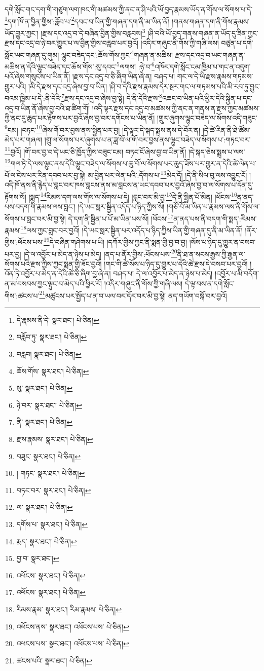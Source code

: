 དགེ་སློང་གང་དག་གི་གཙུག་ལག་ཁང་གི་མཚམས་ཀྱི་ནང་ན་ཤི་པའི་ཡོ་བྱད་རྣམས་ཡོད་ན་གོས་ལ་སོགས་པ་དེ་\footnote{དེ་རྣམས་ནི་དེ་  སྣར་ཐང་།  པེ་ཅིན། }དག་ཁོ་ན་བྱིན་གྱིས་:རློབ་པ་\footnote{བརློབ་ཏུ་  སྣར་ཐང་།  པེ་ཅིན། }དབང་བ་ཡིན་གྱི་གཞན་དག་ནི་མ་ཡིན་ནོ། །གནས་གཞན་དག་ནི་གོས་རྣམས་ཡོད་གྱུར་ཀྱང་། །རྫས་དང་འདྲ་བ་དེ་བཞིན་བྱིན་གྱིས་བརླབས།\footnote{བརླབ།  སྣར་ཐང་།  པེ་ཅིན། } །ཤི་བའི་ཡོ་བྱད་གནས་གཞན་ན་ཡོད་དུ་ཟིན་ཀྱང་རྫས་དང་འདྲ་བ་ཉེ་བར་གྱུར་པ་ལ་བྱིན་གྱིས་བརླབ་པར་བྱའོ། །འདིར་གཞུང་ནི་གོས་ཀྱི་གཞི་ལས། བཙུན་པ་དགེ་སློང་ཡང་གཞན་དུ་གུམ། ལྷུང་བཟེད་དང་:ཆོས་གོས་ཀྱང་\footnote{ཆོས་གོས་  སྣར་ཐང་།  པེ་ཅིན། }གཞན་ན་མཆིས། རྫས་དང་འདྲ་བ་ཡང་གཞན་ན་མཆིས་ན་དེའི་ལྷུང་བཟེད་དང་ཆོས་གོས་:སུ་དབང་\footnote{སུ་  སྣར་ཐང་།  པེ་ཅིན། }ལགས། :ཉེ་བ་\footnote{ཉེ་བར་  སྣར་ཐང་།  པེ་ཅིན། }འཁོར་དགེ་སློང་ངམ་ཁྱིམ་པ་གང་ན་འདུག་པའོ་ཞེས་གསུངས་པ་ཡིན་ནོ། །རྫས་དང་འདྲ་བ་ཅི་ཞིག་ཡིན་ཞེ་ན། བཤད་པ། གང་ལ་དེ་ཡི་རྫས་རྣམས་གཏམས་གྱུར་པའི། །མི་དེ་རྫས་དང་འདྲ་ཞེས་བྱ་བ་ཡིན། །ཤི་བ་དེའི་རྫས་རྣམས་དེར་སྔར་གང་ལ་གཏམས་པའི་མི་རབ་ཏུ་བྱུང་བའམ་ཁྱིམ་པ་དེ་:ནི་དེའི་\footnote{ནི་  སྣར་ཐང་།  པེ་ཅིན། }རྫས་དང་འདྲ་བ་ཞེས་བྱ་སྟེ། དེ་ནི་དེའི་རྫས་\footnote{རྫས་རྣམས་  སྣར་ཐང་།  པེ་ཅིན། }འཆང་བ་ཡིན་པའི་ཕྱིར་དེའི་སྐྱིན་པ་དང་འདྲ་བ་ཡིན་ནོ་ཞེས་བྱ་བའི་ཐ་ཚིག་གོ། །འདི་ལྟར་རྫས་དང་འདྲ་བ་མཚམས་ཀྱི་ནང་ན་གནས་ན་རྫས་ཀྱང་མཚམས་ཀྱི་ནང་དུ་ཆུད་པར་རྟོགས་པར་བྱའོ་ཞེས་བྱ་བར་དགོངས་པ་ཡིན་ནོ། །གྲུར་ཞུགས་ལྷུང་བཟེད་ལ་སོགས་འདི་གཟུང་\footnote{བཟུང་  སྣར་ཐང་།  པེ་ཅིན། }ངམ། །བཏང་\footnote{། གཏང་  སྣར་ཐང་།  པེ་ཅིན། }ཞེས་གོ་བར་བྱས་ནས་སྦྱིན་པར་བྱ། །དེ་ལྟར་དེ་སྐད་སྨྲས་ནས་དེ་བོར་ན། །དེ་ཚེ་རིན་ནི་ཐེ་ཚོམ་མེད་པར་གཞལ། །གྲུ་ལ་སོགས་པར་ཞུགས་པ་ན་ཟླ་བོ་ལ་གོ་བར་བྱས་ནས་ལྷུང་བཟེད་ལ་སོགས་པ་:གཏང་བར་\footnote{བཏང་བར་  སྣར་ཐང་།  པེ་ཅིན། }བྱའོ། །གོ་བར་བྱ་བ་དེ་ཡང་ཅི་ཁྱོད་ཀྱིས་བཟུང་ངམ། བཏང་ངོ་ཞེས་བྱ་བ་ཡིན་ནོ། །དེ་སྐད་ཅེས་སྨྲས་པ་ལས་\footnote{ལ་  སྣར་ཐང་།  པེ་ཅིན། }གལ་ཏེ་དེ་ལས་ལྷུང་ནས་དེའི་ལྷུང་བཟེད་ལ་སོགས་པ་ཆུ་བོ་ལ་སོགས་པར་ཆུད་ཟོས་པར་གྱུར་ན་དེའི་ཚེ་ལེན་པ་པོ་ལ་ངེས་པར་རིན་དབབ་པར་བྱ་སྟེ། མ་བྱིན་པར་ལེན་པའི་:དོགས་པ་\footnote{དགོས་པ་  སྣར་ཐང་།  པེ་ཅིན། }མེད་དོ། །དེ་ནི་སིལ་བུ་ལས་འབྱུང་ངོ། །འདི་ཁོ་ནས་ནི་རྙེད་པ་བླང་བར་ཁས་བླངས་ནས་མ་བླངས་ན་ཡང་དབབ་པར་བྱའོ་ཞེས་བྱ་བ་ལ་སོགས་པ་དོན་དུ་རྟོགས་སོ། །སྨད་\footnote{རྨད་  སྣར་ཐང་།  པེ་ཅིན། }རིམས་དག་ལས་གོས་ལ་སོགས་པ་དེ། །བླང་བར་མི་བྱ་\footnote{བྱ་བ་  སྣར་ཐང་། }དེ་ནི་སྦྱིན་པོ་མིན། །ཕོངས་\footnote{འཕོངས་  སྣར་ཐང་།  པེ་ཅིན། }ན་ནད་པས་བདག་གི་རྣམས་ལས་བླང་། །དེ་ཡང་སླར་སྦྱིན་འདོད་པ་ཉིད་ཀྱིས་སོ། །གཙོ་བོ་མ་ཡིན་པ་རྣམས་ལས་ནི་གོས་ལ་སོགས་པ་བླང་བར་མི་བྱ་སྟེ། དེ་དག་ནི་སྦྱིན་པ་པོ་མ་ཡིན་པས་སོ། །ཕོངས་\footnote{འཕོངས་  སྣར་ཐང་།  པེ་ཅིན། }ན་ནད་པས་ནི་བདག་གི་སྨད་:རིམས་རྣམས་\footnote{རིམས་རྣམ་  སྣར་ཐང་། རིམ་རྣམས་  པེ་ཅིན། }ལས་ཀྱང་བླང་བར་བྱའོ། །དེ་ཡང་སླར་སྦྱིན་པར་འདོད་པ་ཉིད་ཀྱིས་ཡིན་གྱི་གཞན་དུ་ནི་མ་ཡིན་ནོ། །ནོར་གྱིས་:ཕོངས་པས་\footnote{འཕོངས་ནས་  སྣར་ཐང་། འཕོངས་པས་  པེ་ཅིན། }དེ་བཞིན་གཤེགས་པ་ཡི། །དཀོར་གྱིས་ཀྱང་ནི་སྨན་གྱི་བྱ་བ་བྱ། །སོས་པ་ཉིད་དུ་གྱུར་ན་བསབ་པར་བྱ། །དེ་ལ་འབྱོར་པ་མེད་ན་ཉེས་པ་མེད། །ནད་པ་ནོར་གྱིས་:ཕོངས་པས་\footnote{འཕངས་པས་  སྣར་ཐང་། འཕོངས་པས་  པེ་ཅིན། }ནི་ཐ་ན་སངས་རྒྱས་ཀྱི་རྒྱན་ལ་སོགས་པའི་རྫས་ཀྱིས་ཀྱང་སྨན་གྱི་ཟོང་བྱའོ། །གང་གི་ཚེ་སོས་པ་ཉིད་དུ་གྱུར་པ་དེའི་ཚེ་རྫས་དེ་བསབ་པར་བྱའོ། །འོན་ཏེ་འབྱོར་པ་མེད་ན་དེའི་ཚེ་ཅི་ཞིག་བྱ་ཞེ་ན། བཤད་པ། དེ་ལ་འབྱོར་པ་མེད་ན་ཉེས་པ་མེད། །འབྱོར་པ་མི་བདོག་ན་མ་བསབས་ཀྱང་ལྟུང་བ་མེད་པའི་ཕྱིར་རོ། །འདིར་གཞུང་ནི་གོས་ཀྱི་གཞི་ལས། དེ་ལྟ་བས་ན་དགེ་སློང་གིས་:ཚངས་པ་\footnote{ཚངས་པའི་  སྣར་ཐང་།  པེ་ཅིན། }མཚུངས་པར་སྤྱོད་པ་ན་བ་ཡལ་བར་དོར་བར་མི་བྱ་སྟེ། ནད་གཡོག་བསྐོ་བར་བྱའོ། 